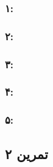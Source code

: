\documentclass[]{exam}
\begin{document}
\subsubsection*{۱:}

\subsubsection*{۲:}

\subsubsection*{۳:}

\subsubsection*{۴:}

\subsubsection*{۵:}


\subsection*{تمرین ۲}

\subsection*{\color{blue}{جواب}}

% 
% 
% 

\end{document}
